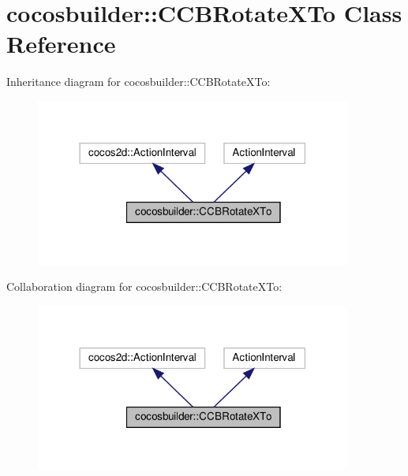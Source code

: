 \hypertarget{classcocosbuilder_1_1CCBRotateXTo}{}\section{cocosbuilder\+:\+:C\+C\+B\+Rotate\+X\+To Class Reference}
\label{classcocosbuilder_1_1CCBRotateXTo}


Inheritance diagram for cocosbuilder\+:\+:C\+C\+B\+Rotate\+X\+To\+:
\nopagebreak
\begin{figure}[H]
\begin{center}
\leavevmode
\includegraphics[width=294pt]{classcocosbuilder_1_1CCBRotateXTo__inherit__graph}
\end{center}
\end{figure}


Collaboration diagram for cocosbuilder\+:\+:C\+C\+B\+Rotate\+X\+To\+:
\nopagebreak
\begin{figure}[H]
\begin{center}
\leavevmode
\includegraphics[width=294pt]{classcocosbuilder_1_1CCBRotateXTo__coll__graph}
\end{center}
\end{figure}
